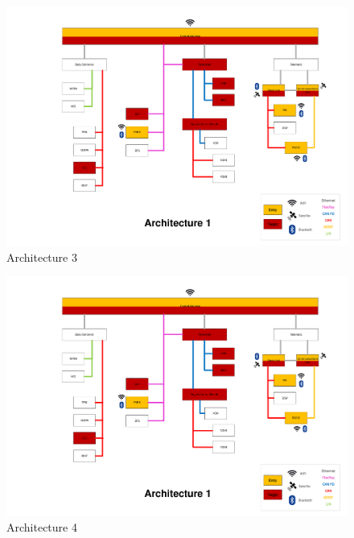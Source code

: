 \begin{figure}[h]
    \centering
    \includegraphics[width=\textwidth, page=3]{../Architectures-survey.pdf}
    \caption{Architecture 3}
    \label{fig:architecture3}
\end{figure}

\begin{figure}[h]
    \centering
    \includegraphics[width=\textwidth, page=4]{../Architectures-survey.pdf}
    \caption{Architecture 4}
    \label{fig:architecture4}
\end{figure}

